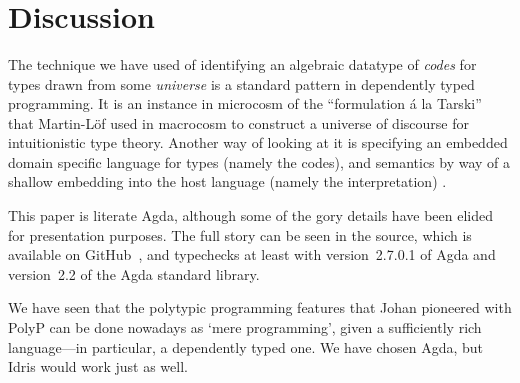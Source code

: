 \documentclass[fleqn,runningheads]{llncs}
\begin{document}
\begin{code}[hide]
\AgdaSpace{}%
\AgdaSymbol{=}\AgdaSpace{}%
\<%
\\
%
\\[\AgdaEmptyExtraSkip]%
\>[0]\AgdaSpace{}%
\AgdaSymbol{:}\AgdaSpace{}%
\AgdaSpace{}%
\AgdaSpace{}%
\AgdaSpace{}%
\AgdaSpace{}%
\AgdaSpace{}%
\AgdaSymbol{=}\AgdaSpace{}%
%
\>[45]\AgdaSpace{}%
\AgdaSpace{}%
\AgdaSymbol{(}\AgdaSpace{}%
\AgdaSpace{}%
\AgdaSymbol{)}\AgdaSpace{}%
\AgdaSpace{}%
\AgdaSpace{}%
\AgdaSpace{}%
\<%
\\
\>[0]\AgdaSpace{}%
\AgdaSpace{}%
\AgdaSymbol{=}\AgdaSpace{}%
\<%
\end{code}


\section{Discussion}

The technique we have used of identifying an algebraic datatype of \emph{codes} for types drawn from some \emph{universe} is a standard pattern in dependently typed programming. It is an instance in microcosm of the ``formulation \'a la Tarski'' that Martin-L{\"o}f \cite{Martin-Lof84:Intuitionistic} used in macrocosm to construct a universe of discourse for intuitionistic type theory. Another way of looking at it is specifying an embedded domain specific language for types (namely the codes), and semantics by way of a shallow embedding into the host language (namely the interpretation) \cite{Gibbons&Wu2014:Folding}.

This paper is literate Agda, although some of the gory details have been elided for presentation purposes. The full story can be seen in the source, which is available on GitHub~\cite{PolyP30-github}, and typechecks at least with version~2.7.0.1 of Agda and version~2.2 of the Agda standard library.

We have seen that the polytypic programming features that Johan pioneered with PolyP can be done nowadays as `mere programming', given a sufficiently rich language---in particular, a dependently typed one. We have chosen Agda, but Idris would work just as well.
\end{document}
